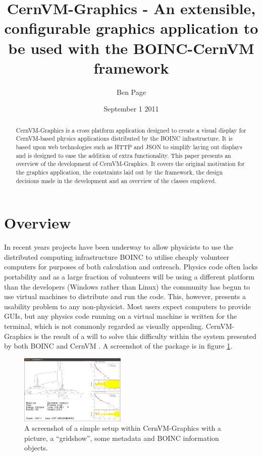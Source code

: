 \documentclass[twocolumn,aps]{revtex4}
\newcommand{\cernvm}{CernVM}
\newcommand{\cernvmgraphics}{\cernvm{}-Graphics}
\newcommand{\boinc}{BOINC}
\newcommand{\json}{JSON}
\begin{document}
  \title
  {
    \cernvmgraphics{} - An extensible, configurable graphics application to 
    be used with the \boinc{}-\cernvm{} framework 
  }

  \date{ September 1 2011 }
  \author{ Ben Page }
  \noaffiliation

  \begin{abstract}
    \cernvmgraphics{} is a cross platform application designed to create a 
    visual display for \cernvm{}-based physics applications distributed by 
    the \boinc{} infrastructure. It is based upon web technologies such as 
    HTTP and \json{} to simplify laying out displays and is designed to ease
    the addition of extra functionality.
    This paper presents an overview of the development of \cernvmgraphics{}.
    It covers the original motivation for the graphics application, the
    constraints laid out by the framework, the design decisions made in 
    the development and an overview of the classes employed.
  \end{abstract}

  \maketitle

  \section{ Overview }
    In recent years projects have been underway to allow physicists to use
    the distributed computing infrastructure \boinc{} 
    \cite{boincIntroduction} to utilise cheaply volunteer computers for 
    purposes of both calculation and outreach. Physics code often lacks 
    portability and as a large fraction of volunteers will be using a 
    different platform than the developers (Windows rather than Linux) the 
    community has begun to use virtual machines to distribute and run the 
    code. This, however, presents a usability problem to any non-physicist.
    Most users expect computers to provide GUIs, but any physics code
    running on a virtual machine is written for the terminal, which is not 
    commonly regarded as visually appealing. \cernvmgraphics{} is the result
    of a will to solve this difficulty within the system presented by both 
    \boinc{} and \cernvm{} \cite{cernvmIntroduction}. A screenshot of the 
    package is in figure \ref{screenshot}.

    \begin{figure}[hbt]
      \label{screenshot}
      \centering
        \includegraphics[width=0.45\textwidth]{graphics/screenshot.png}
      \caption
      {
        A screenshot of a simple setup within \cernvmgraphics{} with a
        picture, a ``gridshow'', some metadata and \boinc{} information 
        objects.
      }
    \end{figure}
\end{document}
